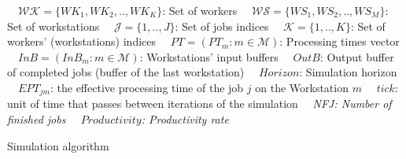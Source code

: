 \documentclass[review,12pt, 3p, times]{elsarticle}
\begin{document}
\begin{algorithm2e}[H]  
  \scriptsize
	\KwData{}	 
	\ \ $\mathcal{WK}=\{WK_1, WK_2,.., WK_K\}$: Set of workers\;
	\ \ $\mathcal{WS}=\{WS_1,WS_2,..,WS_M\}$: Set of workstations\;
	\ \ $\mathcal{J}=\{1,..,J\}$: Set of jobs indices\;
	\ \ $\mathcal{K}=\{1,..,K\}$: Set of workers' (workstations) indices\;
	\ \ $PT=(PT_{m}:  m\in\mathcal{M})$: Processing times vector\;
	\ \ $InB=(InB_m: m\in\mathcal{M})$: Workstations' input buffers\;
	\ \ $OutB$: Output buffer of completed jobs (buffer of the last workstation)\;
	\ \ $Horizon$: Simulation horizon\;
	\ \  $EPT_{jm}$: the effective processing time of the job $j$ on the Workstation $m$ \;
	\ \ $tick$: unit of time that passes between iterations of the simulation \;
	\KwResult{}
	\ \ \it{NFJ}: Number of finished jobs  \; 
	\ \ $Productivity$: Productivity rate  \;
	\caption{Simulation algorithm}
            \label{algo:algorithmsimulator}
\end{algorithm2e}	   
				
\end{document}
